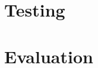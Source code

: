 \documentclass{article}
\begin{document}

\tableofcontents
\newpage



\newpage


\newpage

\section{Testing}
\section{Evaluation}

\newpage
\printbibliography
\end{document}
